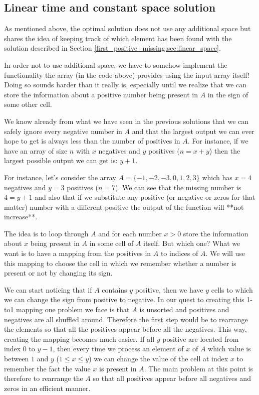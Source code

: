 \subsection{Linear time and constant space solution}
\label{first_positive_missing:sec:constant_space}
As mentioned above, the optimal solution does not use any additional space but shares the idea of keeping track of which element has been found with the solution described in Section \ref{first_positive_missing:sec:linear_space}. 

In order not to use additional space, we have to somehow implement the functionality the array  (in the code above) provides using the input array itself! Doing so sounds harder than it really is, especially until we realize that we can store the information about a positive number being present in $A$ in the sign of some other cell.

We know already from what we have seen in the previous solutions that we can safely ignore every negative number in $A$ and that the largest output we can ever hope to get is always less than the number of positives in $A$. For instance, if we have an array of size $n$ with $x$ negatives and $y$ positives ($n=x+y$) then the largest possible output we can get is: $y+1$. 

For instance, let's consider the array $A=\{-1, -2, -3, 0, 1, 2, 3\}$ which has $x=4$ negatives and $y=3$ positives ($n=7$). We can see that the missing number is $4=y+1$ and also that if we substitute any positive (or negative or zeros for that matter) number with a different positive the output of the function will **not increase**. 

The idea is to loop through $A$ and for each number $x>0$ store the information about $x$ being present in $A$ in some cell of $A$ itself. But which one? What we want is to have a mapping from the positives in $A$ to indices of $A$. We will use this mapping to choose the cell in which we remember whether a number is present or not by changing its sign.

We can start noticing that if $A$ contains $y$ positive, then we have $y$ cells to which we can change the sign from positive to negative. In our quest to creating this 1-to1 mapping one problem we face is that $A$ is unsorted and positives and negatives are all shuffled around. Therefore the first step would be to rearrange the elements so that all the positives appear before all the negatives. This way, creating the mapping becomes much easier. If all $y$ positive are located from index $0$ to $y-1$, then every time we process an element of $x$ of $A$ which value is between $1$ and $y$ ($1 \leq x \leq y$) we can change the value of the cell at index $x$ to remember the fact the value $x$ is present in $A$. The main problem at this point is therefore to rearrange the $A$ so that all positives appear before all negatives and zeros in an efficient manner.


